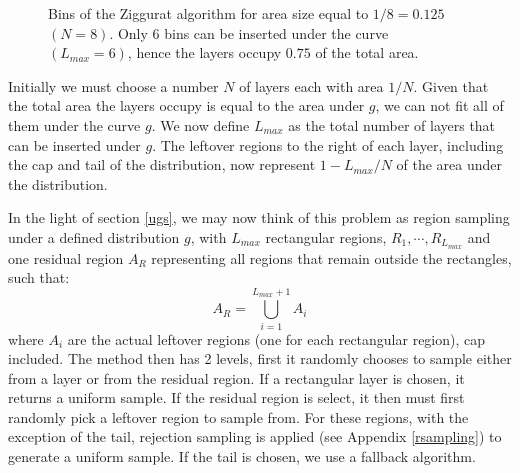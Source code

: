 \documentclass[11pt,onecolumn]{article}
\let\oldref\ref%
\def\ref{\oldref*}}
\begin{document}
\begin{figure}[h]
	\caption{Bins of the Ziggurat algorithm for area size equal to $1/8=0.125$ $(N=8)$. Only 6 bins can be inserted under the curve $(L_{max}=6)$, hence the layers occupy $0.75$ of the total area.}
	\label{fig:zig}
\end{figure}

Initially we must choose a number $N$ of layers each with area $1/N$. Given that the total area the layers occupy is equal to the area under $g$, we can not fit all of them under the curve $g$. We now define $L_{max}$ as the total number of layers that can be inserted under $g$. The leftover regions to the right of each layer, including the cap and tail of the distribution, now represent $1-L_{max}/N$ of the area under the distribution. 

In the light of section \ref{ugs}, we may now think of this problem as region sampling under a defined distribution $g$, with $L_{max}$ rectangular regions, $R_1, \dotsb, R_{L_{max}}$ and one residual region $A_R$ representing all regions that remain outside the rectangles, such that:
$$A_R=\bigcup_{i=1}^{L_{max}+1} A_i$$
where $A_i$ are the actual leftover regions (one for each rectangular region), cap included. The method then has 2 levels, first it randomly chooses to sample either from a layer or from the residual region. If a rectangular layer is chosen, it returns a uniform sample. If the residual region is select, it then must first randomly pick a leftover region to sample from. For these regions, with the exception of the tail, rejection sampling is applied (see Appendix \ref{rsampling}) to generate a uniform sample. If the tail is chosen, we use a fallback algorithm.
\end{document}

